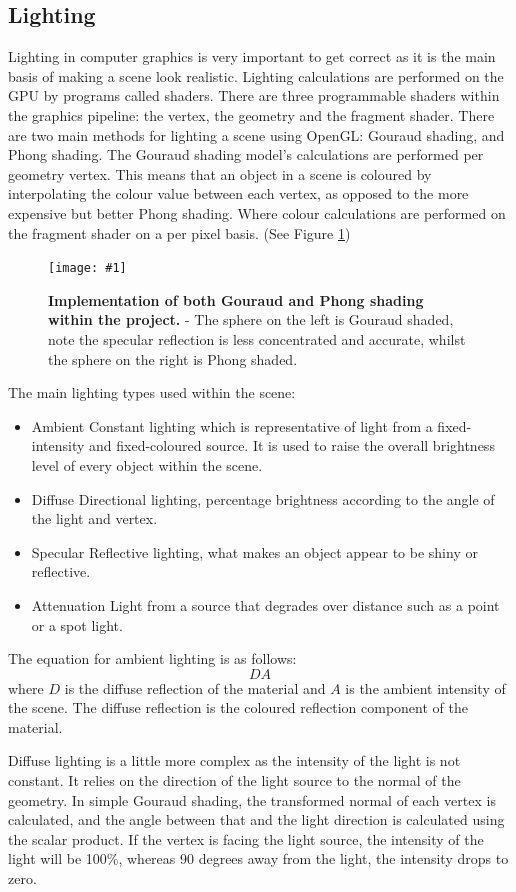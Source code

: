\documentclass[conference]{acmsiggraph}
\newcommand{\figuremacroW}[4]{
\begin{figure}[h] %
	\centering
	\texttt{[image: \#1]}
	\caption[#2]{\textbf{#2} - #3}
	\label{fig:#1}
\end{figure}
}
\begin{document}
\subsection{Lighting}
Lighting in computer graphics is very important to get correct as it is the main basis of making a scene look realistic. Lighting calculations are performed on the GPU by programs called shaders. There are three programmable shaders within the graphics pipeline: the vertex, the geometry and the fragment shader.
There are two main methods for lighting a scene using OpenGL: Gouraud shading, and Phong shading.
The Gouraud shading model's calculations are performed per geometry vertex. This means that an object in a scene is coloured by interpolating the colour value between each vertex, as opposed to the more expensive but better Phong shading. Where colour calculations are performed on the fragment shader on a per pixel basis. (See Figure \ref{fig:gouraudPhong})
	
\figuremacroW
{gouraudPhong}
{Implementation of both Gouraud and Phong shading within the project. }
{The sphere on the left is Gouraud shaded, note the specular reflection is less concentrated and accurate, whilst the sphere on the right is Phong shaded.}
{1.0}
	
The main lighting types used within the scene:
\begin{itemize}
	\item {Ambient} Constant lighting which is representative of light from a fixed-intensity and fixed-coloured source. It is used to raise the overall brightness level of every object within the scene. 
	\item {Diffuse} Directional lighting, percentage brightness according to the angle of the light and vertex.
	\item {Specular} Reflective lighting, what makes an object appear to be shiny or reflective.
	\item {Attenuation} Light from a source that degrades over distance such as a point or a spot light.
\end{itemize}
	
The equation for ambient lighting is as follows:
\begin{equation} \label{ambientLightingEq}
	DA
\end{equation}
where $D$ is the diffuse reflection of the material and $A$ is the ambient intensity of the scene. The diffuse reflection is the coloured reflection component of the material.
	
Diffuse lighting is a little more complex as the intensity of the light is not constant. It relies on the direction of the light source to the normal of the geometry. In simple Gouraud shading, the transformed normal of each vertex is calculated, and the angle between that and the light direction is calculated using the scalar product. If the vertex is facing the light source, the intensity of the light will be 100\%, whereas 90 degrees away from the light, the intensity drops to zero.
	
\end{document}
